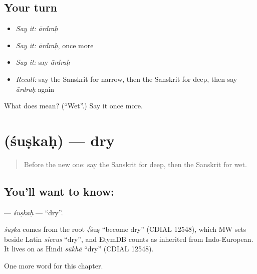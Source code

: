 \subsection*{Your turn}
\begin{itemize}
\raggedright
  \item \emph{Say it:} \emph{ārdraḥ}
  \item \emph{Say it:} \emph{ārdraḥ}, once more
  \item \emph{Say it:} say \emph{ārdraḥ}
  \item \emph{Recall:} say the Sanskrit for narrow, then the Sanskrit for deep, then say \emph{ārdraḥ} again
\end{itemize}

\begin{tcolorbox}[breakable,colback=teal!4,colframe=teal!35!black,title={Before you move on}]
What does  mean? (\textquotedblleft{}Wet\textquotedblright{}.) Say it once more.
\end{tcolorbox}
\section[\texorpdfstring{\sk{शुष्कः} (śuṣkaḥ)}{शुष्कः (śuṣkaḥ)}]{ (śuṣkaḥ) — dry}

\label{lesson:SA-C126-suskah}



\begin{quote}
Before the new one: say the Sanskrit for deep, then the Sanskrit for wet.
\end{quote}

\subsection*{You'll want to know: }
\textbf{} — \emph{śuṣkaḥ} — \textquotedblleft{}dry\textquotedblright{}.

\begin{cousinweb}
\emph{śuṣka} comes from the root √śuṣ \textquotedblleft{}become dry\textquotedblright{} (CDIAL 12548), which MW sets beside Latin \emph{siccus} \textquotedblleft{}dry\textquotedblright{}, and EtymDB counts as inherited from Indo-European. It lives on as Hindi \emph{sūkhā} \textquotedblleft{}dry\textquotedblright{} (CDIAL 12548).
\end{cousinweb}

\begin{grammarlens}[title={What you've built}]
One more word for this chapter.
\end{grammarlens}

